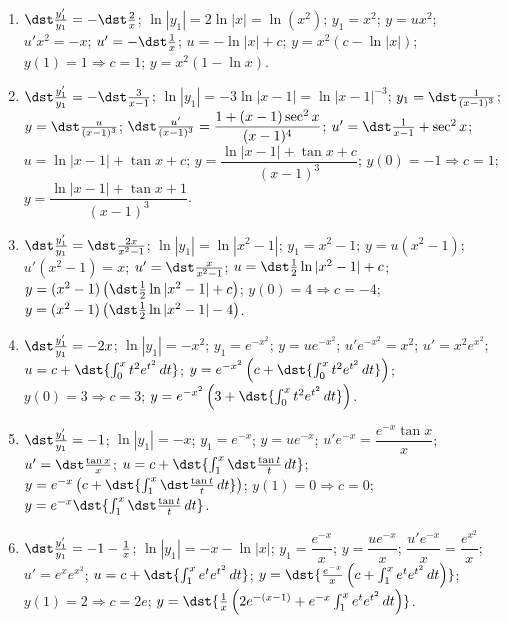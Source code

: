 \documentclass[openany]{book}
\newenvironment{sectionSolutions}{
 \begin{enumerate}[item-label={\thesection.\arabic{enumi}.}]
}{
 \end{enumerate}
}
\begin{document}
\begin{sectionSolutions}
\item
$\dst\frac{y_1'}{ y_1}=-\dst\frac{2}{ x}$;\quad
$\ln|y_1|=2\ln|x|=\ln(x^2)$;\quad
$y_1=x^2$;\quad
$y=ux^2$;\quad
$u'x^2=-x$;\quad
$u'=-\dst\frac{1}{ x}$;\quad
$u=-\ln|x|+c$;\quad
$y=x^2(c-\ln|x|)$;\quad
$y(1)=1\Rightarrow c=1$;\quad
$y=x^2(1-\ln x)$.


\item
$\dst\frac{y_1'}{ y_1}=-\dst\frac{3}{ x-1}$;\quad
$\ln|y_1|=-3\ln|x-1|=\ln|x-1|^{-3}$;\quad
$y_1=\dst\frac{1}{(x-1)^3}$;\quad
$y=\dst\frac{u}{(x-1)^3}$;\quad
$\dst\frac{u'}{(x-1)^3}=\dfrac{1+(x-1)\sec^2x}{(x-1)^4}$;\quad
$u'=\dst\frac{1}{ x-1}+\sec^2x$;\quad
$u=\ln|x-1|+\tan x+c$;\quad
$y=\dfrac{\ln|x-1|+\tan x+c}{(x-1)^3}$;\quad
$y(0)=-1\Rightarrow c=1$;\quad
$y=\dfrac{\ln|x-1|+\tan
x+1}{(x-1)^3}$.



\item
$\dst\frac{y_1'}{ y_1}=\dst\frac{2x}{ x^2-1}$;\quad
$\ln|y_1|=\ln|x^2-1|$;\quad
$y_1=x^2-1$;\quad
$y=u(x^2-1)$;\quad
$u'(x^2-1)=x$;\quad
$u'=\dst\frac{x}{ x^2-1}$;\quad
$u=\dst\frac{1}{2}\ln|x^2-1|+c$;\quad
$y=(x^2-1)\left(\dst\frac{1}{2}\ln|x^2-1|+c\right)$;\quad
$y(0)=4\Rightarrow c=-4$;\quad
$y=(x^2-1)\left(\dst\frac{1}{2}\ln|x^2-1|-4\right)$.


\item
$\dst\frac{y_1'}{ y_1}=-2x$;\quad
$\ln|y_1|=-x^2$;\quad
$y_1=e^{-x^2}$;\quad
$y=ue^{-x^2}$;\quad
$u'e^{-x^2}=x^2$;\quad
$u'=x^2e^{x^2}$;\quad
$u=c+\dst{\int_0^xt^2e^{t^2}\,dt}$;\quad
$y=e^{-x^2}\left(c+\dst{\int_0^xt^2e^{t^2}\,dt}\right)$;\quad
$y(0)=3\Rightarrow c=3$;\quad
$y=e^{-x^2}\left(3+\dst{\int_0^xt^2e^{t^2}\,dt}\right)$.


\item
$\dst\frac{y_1'}{ y_1}=-1$;\quad
$\ln|y_1|=-x$;\quad
$y_1=e^{-x}$;\quad
$y=ue^{-x}$;\quad
$u'e^{-x}=\dfrac{e^{-x}\tan x}{ x}$;\quad
$u'=\dst\frac{\tan x}{ x}$;\quad
$u=c+\dst{\int_1^x\dst\frac{\tan t}{ t}\,dt}$;\quad
$y=e^{-x}\left(c+\dst{\int_1^x\dst\frac{\tan t}{ t}\,dt}\right)$;\quad
$y(1)=0\Rightarrow c=0$;\quad
$y=e^{-x}\dst{\int_1^x\dst\frac{\tan t}{ t}\,dt}$.


\item
$\dst\frac{y_1'}{ y_1}=-1-\frac{1}{ x}$;\quad
$\ln|y_1|=-x-\ln|x|$;\quad
$y_1=\dfrac{e^{-x}}{ x}$;\quad
$y=\dfrac{ue^{-x}}{ x}$;\quad
$\dfrac{u'e^{-x}}{ x}=\dfrac{e^{x^2}}{ x}$;\quad
$u'=e^xe^{x^2}$;\quad
$u=c+\dst{\int_1^xe^te^{t^2}\,dt}$;\quad
$y=\dst{\frac{e^{-x}}{ x}\left(c+\int_1^xe^te^{t^2}\,dt\right)}$;\quad
$y(1)=2\Rightarrow c=2e$;\quad
$y=\dst{\frac{1}{
x}\left(2e^{-(x-1)}+e^{-x}\int_1^xe^te^{t^2}\,dt\right)}$.



\end{sectionSolutions}
\end{document}
